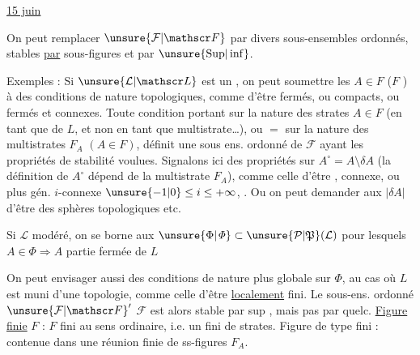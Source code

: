  \uline{15 juin}

On peut remplacer $\unsure{\mathcal F|\mathscr F}$ par divers  sous-ensembles ordonnés, stables \uline{par} \deleted{$\unsure{\in}$}  
sous-figures  et par $\unsure{\mathrm{Sup}|\inf}$.

Exemples : Si $\unsure{\mathcal L|\mathscr L}$ est un   , 
on peut soumettre les $A\in F$  ($F$ )
à des conditions de nature topologiques, comme d'être fermés, ou  compacts, ou fermés et connexes. Toute condition
portant sur la nature des strates $A\in F$ (en tant que  de $L$, et non en tant que multistrate\ldots), ou $=$ sur la nature des
multistrates $F_A$ $(A\in F)$, définit une sous ens. ordonné de $\mathcal F$ ayant les propriétés de stabilité voulues. Signalons ici
des propriétés  sur  $A^\circ=A\setminus\delta A$ (la définition de $A^\circ$ dépend de la multistrate $F_A$), comme celle d'être  ,
  connexe, ou plus gén. $i$-connexe $\unsure{-1|0}\leq i\leq+\infty$,  . Ou on peut demander aux $|\delta A|$
d'être des sphères topologiques etc.

Si $\mathcal L$   modéré, on se borne aux $\unsure{\Phi|\mathit{\Phi}}\subset\unsure{\mathcal P|\mathfrak P}(\mathcal L)$ pour lesquels $A\in\Phi\Longrightarrow A$ partie fermée \uline{} de $L$

On peut envisager aussi des conditions de nature plus globale sur $\Phi$, au cas où
$L$ est muni d'une topologie, comme celle d'être \uline{localement} fini. Le sous-ens.
ordonné ${\unsure{\mathcal F|\mathscr F}}'$  $\mathcal F$ est alors stable par sup , mais pas   par 
quelc. \uline{Figure finie} $F$ :  $F$ fini au sens ordinaire, i.e. un  fini de strates. Figure de type fini : contenue
dans une réunion finie de ss-figures $F_A$.

